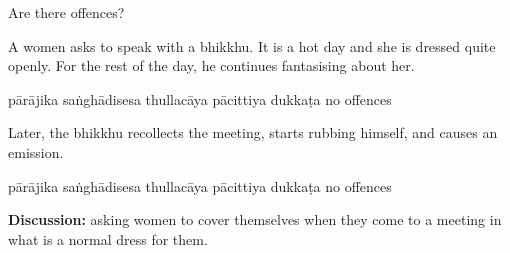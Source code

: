\begin{exam}{\autoExamName}
\begin{problem*}
  Are there offences?

\begin{parts}

\item
  A women asks to speak with a bhikkhu.
  It is a hot day and she is dressed quite openly.
  For the rest of the day, he continues fantasising about her.

  \bigskip

  \begin{answers}{6}
    \bChoices
     pārājika\eAns
     saṅghādisesa\eAns
     thullacāya\eAns
     pācittiya\eAns
     dukkaṭa\eAns
     no offences\eAns
    \eChoices
  \end{answers}

  \bigskip

  \item Later, the bhikkhu recollects the meeting, starts rubbing himself, and causes an emission.

  \bigskip

  \begin{answers}{6}
    \bChoices
     pārājika\eAns
     saṅghādisesa\eAns
     thullacāya\eAns
     pācittiya\eAns
     dukkaṭa\eAns
     no offences\eAns
    \eChoices
  \end{answers}

  \bigskip

  \textbf{Discussion:} asking women to cover themselves when they come to a
  meeting in what is a normal dress for them.

  \bigskip

\end{parts}

\end{problem*}

\end{exam}
